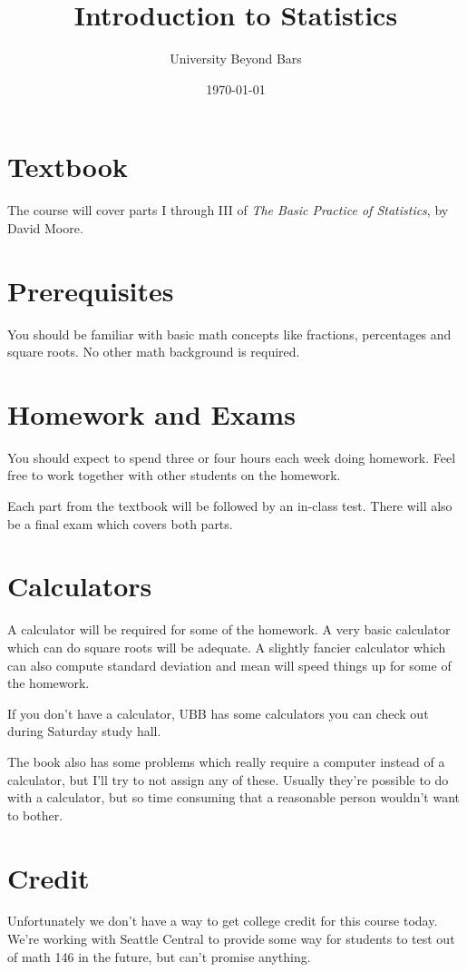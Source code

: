 \documentclass[fleqn, onecolumn]{article}
\title{Introduction to Statistics}
\author{University Beyond Bars}
\date{\today}
\begin{document}
  \maketitle

  \section{Textbook}
  The course will cover parts I through III of {\em The Basic Practice of Statistics}, by David Moore.  

  \section{Prerequisites}
  You should be familiar with basic math concepts like fractions, percentages and square roots.  No other math
  background is required.

  \section{Homework and Exams}

  You should expect to spend three or four hours each week doing homework.  Feel free to work together with other students
  on the homework.

  Each part from the textbook will be followed by an in-class test.  There will also be a final exam which covers both parts.

  \section{Calculators}
  A calculator will be required for some of the homework.  A very basic calculator which can do square roots will be
  adequate.  A slightly fancier calculator which can also compute standard deviation and mean will speed things up for
  some of the homework.

  If you don't have a calculator, UBB has some calculators you can check out during Saturday study hall.  

  The book also has some problems which really require a computer instead of a calculator, but I'll try to not assign
  any of these.  Usually they're possible to do with a calculator, but so time consuming that a reasonable person
  wouldn't want to bother.  

  \section{Credit}
  Unfortunately we don't have a way to get college credit for this course today.  We're working with Seattle Central to
  provide some way for students to test out of math 146 in the future, but can't promise anything.
\end{document}
